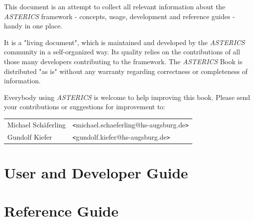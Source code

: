 \documentclass[12pt,english]{scrreprt}
\let\myTOC\tableofcontents
\renewcommand\tableofcontents{%
  \pdfbookmark[1]{Contents}{}
  \myTOC
  \cleardoublepage
  \pagenumbering{arabic} }
\newcommand{\asterics}{\textit{ASTERICS}\xspace}
\begin{document}
This document is an attempt to collect all relevant information about the \asterics framework - concepts, usage, development and reference guides - handy in one place.

\bigskip

\noindent It is a "living document", which is maintained and developed by the \asterics community in a self-organized way. Its quality relies on the contributions of all those many developers contributing to the framework. 
The \asterics Book is distributed "as is" without any warranty regarding correctness or completeness of information.

\bigskip

\noindent Everybody using \asterics is welcome to help improving this book. Please send your contributions or suggestions for improvement to:

\bigskip

\begin{tabular}{ll}
    Michael Schäferling & \texttt{<}michael.schaeferling@hs-augsburg.de\texttt{>}\\
    Gundolf Kiefer & \texttt{<}gundolf.kiefer@hs-augsburg.de\texttt{>}
\end{tabular}





\newpage

\setcounter{tocdepth}{2}

\tableofcontents{}





\part{User and Developer Guide}





\part{Reference Guide}





\ifdefined\astericsinternal

\fi

\ifdefined\astericsinternal

\fi

\ifdefined\astericsinternal

\fi
\end{document}
